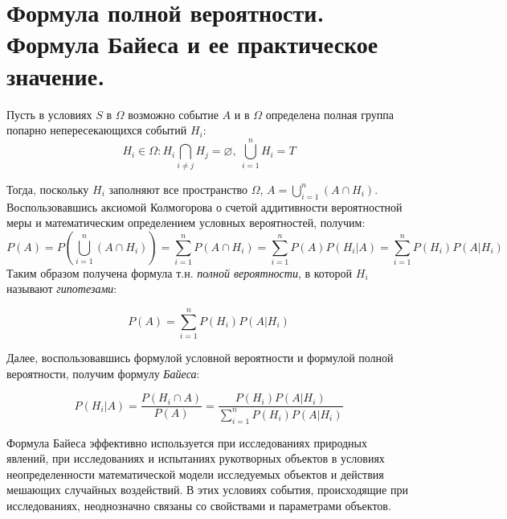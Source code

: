 \documentclass[polytech/stats/exam-2023/stats-exam-2023.tex]{subfiles}
\begin{document}
\section{Формула полной вероятности. Формула Байеса и ее практическое значение.}
    Пусть в условиях $S$ в $\Omega$ возможно событие $A$ и в $\Omega$ определена
    полная группа попарно непересекающихся событий $H_i$:
    \begin{equation*}
        H_i \in \Omega: H_i \bigcap_{i \neq j} H_j = \varnothing, \ \bigcup_{i = 1}^n H_i = T
    \end{equation*}

    Тогда, поскольку $H_i$ заполняют все пространство $\Omega$, $A = \bigcup_{i = 1}^n \left(A \cap H_i \right)$.
    Воспользовавшись аксиомой Колмогорова о счетой аддитивности вероятностной меры и математическим определением
    условных вероятностей, получим:
    \begin{equation*}
        P(A) = P\left(\bigcup_{i=1}^n \left(A \cap H_i\right) \right) = \sum_{i=1}^n P(A \cap H_i) = \sum_{i=1}^n P(A)P(H_i | A) =%
        \sum_{i=1}^n P(H_i) P(A | H_i)
    \end{equation*}
    Таким образом получена формула т.н. \textit{полной вероятности}, в которой $H_i$ называют \textit{гипотезами}:
    \begin{theorem}
        \begin{equation*}
            P(A) = \sum_{i = 1}^n P(H_i) P(A | H_i)
        \end{equation*}
    \end{theorem}

    Далее, воспользовавшись формулой условной вероятности и формулой полной вероятности, получим формулу \textit{Байеса}:
    \begin{theorem}
        \begin{equation*}
            P(H_i | A) = \frac{P(H_i \cap A)}{P(A)} = \frac{P(H_i) P(A | H_i)}{\sum_{i=1}^n P(H_i) P(A | H_i)}
        \end{equation*}
    \end{theorem}
    Формула Байеса эффективно используется при исследованиях природных явлений, при исследованиях и испытаниях рукотворных объектов
    в условиях неопределенности математической модели исследуемых объектов и действия мешающих случайных воздействий. 
    В этих условиях события, происходящие при исследованиях, неоднозначно связаны со свойствами и параметрами объектов.
\end{document}
